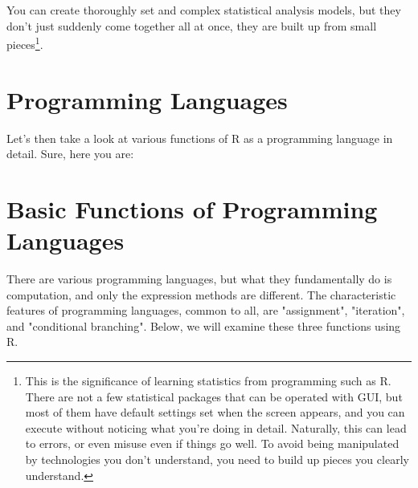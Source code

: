 \documentclass{ltjsbook}
\begin{document}
You can create thoroughly set and complex statistical analysis models, but they don't just suddenly come together all at once, they are built up from small pieces\footnote{This is the significance of learning statistics from programming such as R. There are not a few statistical packages that can be operated with GUI, but most of them have default settings set when the screen appears, and you can execute without noticing what you're doing in detail. Naturally, this can lead to errors, or even misuse even if things go well. To avoid being manipulated by technologies you don't understand, you need to build up pieces you clearly understand.}.


\section{Programming Languages}

Let's then take a look at various functions of R as a programming language in detail.
Sure, here you are:

\section{Basic Functions of Programming Languages}
There are various programming languages, but what they fundamentally do is computation, and only the expression methods are different. The characteristic features of programming languages, common to all, are "assignment", "iteration", and "conditional branching". Below, we will examine these three functions using R.
\end{document}
